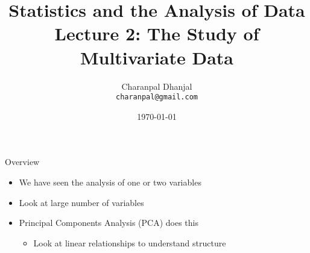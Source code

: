 \documentclass{beamer}
\title{Statistics and the Analysis of Data\\ Lecture 2: The Study of Multivariate Data}
\author{Charanpal Dhanjal \\ \texttt{charanpal@gmail.com}}
\institute{\'{E}cole des Ponts}
\date{\today}
\begin{document}
\frame{\titlepage}

\begin{frame}{Overview} 
\begin{itemize} 
 \item We have seen the analysis of one or two variables 
\item Look at large number of variables 
\item Principal Components Analysis (PCA) does this 
\begin{itemize}
  \item Look at linear relationships to understand structure 
\end{itemize}
 \end{itemize}
\end{frame}
\end{document}
